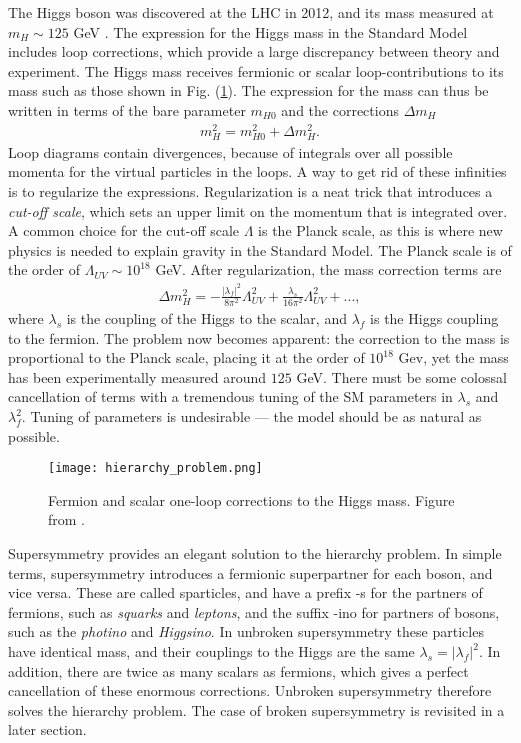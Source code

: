\documentclass[twoside,english]{uiofysmaster}
\begin{document}
The Higgs boson was discovered at the LHC in 2012, and its mass  measured at $m_H \sim 125$ GeV \cite{20121}. The expression for the Higgs mass in the Standard Model includes loop corrections, which provide a large discrepancy between theory and experiment. The Higgs mass receives fermionic or scalar loop-contributions to its mass such as those shown in Fig. (\ref{Fig:: Phys. bac.: Higgs mass contributions}). The expression for the mass can thus be written in terms of the bare parameter $m_{H0}$ and the corrections $\Delta m_H$
\begin{align*}
m_H^2 = m_{H0}^2 + \Delta m_H^2.
\end{align*}
Loop diagrams contain divergences, because of integrals over all possible momenta for the virtual particles in the loops. A way to get rid of these infinities is to regularize the expressions. Regularization is a neat trick that introduces a \textit{cut-off scale}, which sets an upper limit on the momentum that is integrated over. A common choice for the cut-off scale $\Lambda$ is the Planck scale, as this is where new physics is needed to explain gravity in the Standard Model. The Planck scale is of the order of $\Lambda_{UV} \sim 10^{18}$ GeV. After regularization, the mass correction terms are
\begin{align}
\Delta m_H^2 = - \frac{|\lambda_f|^2}{8\pi^2} \Lambda_{UV}^2 + \frac{\lambda_s}{16\pi^2} \Lambda_{UV}^2 +...,
\end{align}
where $\lambda_s$ is the coupling of the Higgs to the scalar, and $\lambda_f$ is the Higgs coupling to the fermion. The problem now becomes apparent: the correction to the mass is proportional to the Planck scale, placing it at the order of $10^{18}$ Gev, yet the mass has been experimentally measured around $125$ GeV. There must be some colossal cancellation of terms with a tremendous tuning of the SM parameters in $\lambda_s$ and $\lambda_f^2$. Tuning of parameters is undesirable --- the model should be as natural as possible. 

\begin{figure}[H]
\centering
\texttt{[image: hierarchy\_problem.png]}
\caption{Fermion and scalar one-loop corrections to the Higgs mass. Figure from \cite{batzing2017lecture}.}
\label{Fig:: Phys. bac.: Higgs mass contributions}
\end{figure}

Supersymmetry provides an elegant solution to the hierarchy problem. In simple terms, supersymmetry introduces a fermionic superpartner for each boson, and vice versa. These are called sparticles, and have a prefix -s for the partners of fermions, such as \textit{squarks} and \textit{leptons}, and the suffix -ino for partners of bosons, such as the \textit{photino} and \textit{Higgsino}. In unbroken supersymmetry these particles have identical mass, and their couplings to the Higgs are the same $\lambda_s = |\lambda_f|^2$. In addition, there are twice as many scalars as fermions, which gives a perfect cancellation of these enormous corrections. Unbroken supersymmetry therefore solves the hierarchy problem. The case of broken supersymmetry is revisited in a later section.
\end{document}
